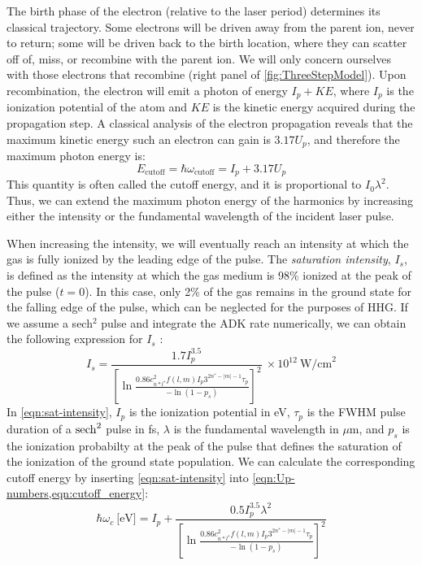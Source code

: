 The birth phase of the electron (relative to the laser period) determines its classical trajectory. Some electrons will be driven away from the parent ion, never to return; some will be driven back to the birth location, where they can scatter off of, miss, or recombine with the parent ion. We will only concern ourselves with those electrons that recombine (right panel of \cref{fig:ThreeStepModel}). Upon recombination, the electron will emit a photon of energy $I_p + KE$, where $I_p$ is the ionization potential of the atom and $KE$ is the kinetic energy acquired during the propagation step. A classical analysis of the electron propagation reveals that the maximum kinetic energy such an electron can gain is $3.17 U_p$, and therefore the maximum photon energy is: 
\begin{equation}
E_{\textrm{cutoff}} = \hbar \omega_{\textrm{cutoff}} = I_p + 3.17 U_p
\label{eqn:cutoff_energy}
\end{equation}
This quantity is often called the cutoff energy, and it is proportional to $I_0 \lambda^2$. Thus, we can extend the maximum photon energy of the harmonics by increasing either the intensity or the fundamental wavelength of the incident laser pulse.

When increasing the intensity, we will eventually reach an intensity at which the gas is fully ionized by the leading edge of the pulse. The \textit{saturation intensity}, $I_s$, is defined as the intensity at which the gas medium is 98\% ionized at the peak of the pulse ($t=0$). In this case, only 2\% of the gas remains in the ground state for the falling edge of the pulse, which can be neglected for the purposes of HHG. If we assume a sech$^2$ pulse and integrate the ADK rate numerically, we can obtain the following expression for $I_{s}$ \cite{changFundamentalsAttosecondOptics2011}:
\begin{equation}
I_s = \frac{1.7 I_p^{3.5}}{\left[ \ln \frac{0.86 c_{n*l^*}^2 f(l,m) I_p 3^{2n^*-|m|-1} \tau_p}{- \ln(1-p_s)}\right]^2} \ \times 10^{12} \ \textrm{W/cm}^2
\label{eqn:sat-intensity}
\end{equation}
In \cref{eqn:sat-intensity}, $I_p$ is the ionization potential in eV, $\tau_p$ is the FWHM pulse duration of a $\sech^2$ pulse in fs, $\lambda$ is the fundamental wavelength in $\mu$m, and $p_s$ is the ionization probabilty at the peak of the pulse that defines the saturation of the ionization of the ground state population. We can calculate the corresponding cutoff energy by inserting \cref{eqn:sat-intensity} into \cref{eqn:Up-numbers,eqn:cutoff_energy}:
\begin{equation}
\hbar \omega_c \ \textrm{[eV]} = I_p + \frac{0.5 I_p^{3.5} \lambda^2}{\left[ \ln \frac{0.86 c_{n*l^*}^2 f(l,m) I_p 3^{2n^*-|m|-1} \tau_p}{- \ln(1-p_s)}\right]^2}
\label{eqn:sat-int-cutoff}
\end{equation}

